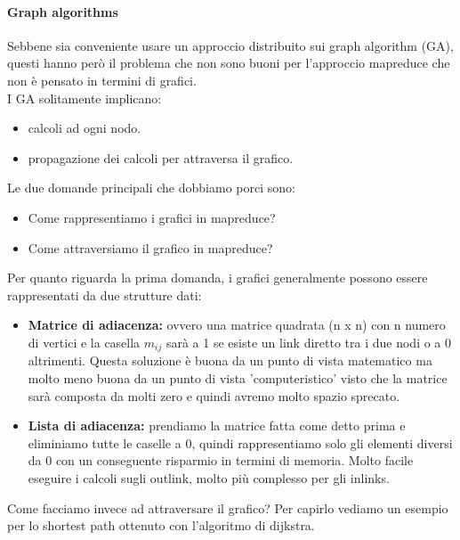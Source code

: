 \documentclass{article}
\begin{document}
\begin{appendices}
\paragraph{Graph algorithms}
Sebbene sia conveniente usare un approccio distribuito sui graph algorithm (GA), questi hanno però il problema che non sono buoni per l'approccio mapreduce che non è pensato in termini di grafici.\\
I GA solitamente implicano:
\begin{itemize}
    \item calcoli ad ogni nodo.
    \item propagazione dei calcoli per attraversa il grafico.
\end{itemize}
Le due domande principali che dobbiamo porci sono:
\begin{itemize}
    \item Come rappresentiamo i grafici in mapreduce?
    \item Come attraversiamo il grafico in mapreduce?
\end{itemize}
Per quanto riguarda la prima domanda, i grafici generalmente possono essere rappresentati da due strutture dati:
\begin{itemize}
    \item \textbf{Matrice di adiacenza:} ovvero una matrice quadrata (n x n) con n numero di vertici e la casella $m_{ij}$ sarà a 1 se esiste un link diretto tra i due nodi o a 0 altrimenti. Questa soluzione è buona da un punto di vista matematico ma molto meno buona da un punto di vista 'computeristico' visto che la matrice sarà composta da molti zero e quindi avremo molto spazio sprecato.
    \item \textbf{Lista di adiacenza:} prendiamo la matrice fatta come detto prima e eliminiamo tutte le caselle a 0, quindi rappresentiamo solo gli elementi diversi da 0 con un conseguente risparmio in termini di memoria. Molto facile eseguire i calcoli sugli outlink, molto più complesso per gli inlinks.
\end{itemize}
Come facciamo invece ad attraversare il grafico? Per capirlo vediamo un esempio per lo shortest path ottenuto con l'algoritmo di dijkstra.
\begin{figure}[H]
    \centering

\end{figure}
\end{appendices}
\end{document}

